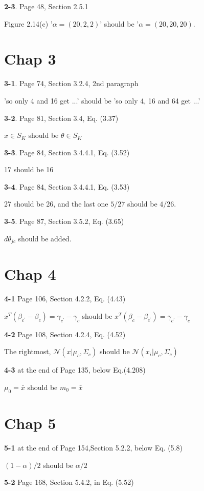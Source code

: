 \documentclass[aps,preprint,a4]{revtex4-1}
\begin{document}
{\color{red}\textbf{2-3}}. Page 48, Section 2.5.1

Figure 2.14(c) '$\alpha = (20,2,2)$' should be '$\alpha = (20,20,20)$.
\section{Chap 3}
{\color{red}\textbf{3-1}}. Page 74, Section 3.2.4, 2nd paragraph

'so only 4 and 16 get ...' should be 'so only 4, 16 and 64 get ...'

{\color{red}\textbf{3-2}}.  Page 81, Section 3.4, Eq. (3.37)

$x\in S_{K}$ should be $\theta \in S_{K}$ 

{\color{red}\textbf{3-3}}.  Page 84, Section 3.4.4.1, Eq. (3.52)

17 should be 16

{\color{red}\textbf{3-4}}.  Page 84, Section 3.4.4.1, Eq. (3.53)

27 should be 26, and the last one $5/27$ should be $4/26$.

{\color{red}\textbf{3-5}}.  Page 87, Section 3.5.2, Eq. (3.65)

$d\theta_{jc}$ should be added.

\section{Chap 4}
{\color{red}\textbf{4-1}} Page 106, Section 4.2.2, Eq. (4.43)

$x^{T}(\beta_{c^{\prime}}-\beta_{c})=\gamma_{c^{\prime}}-\gamma_{c}$
should be
 $x^{T}(\beta_{c}-\beta_{c^{\prime}})=\gamma_{c^{\prime}}-\gamma_{c}$

{\color{red}\textbf{4-2}} Page 108, Section 4.2.4, Eq. (4.52)

The rightmost, $\mathcal N(x|\mu_{c},\Sigma_{c})$ should be
$\mathcal N(x_{i}|\mu_{c},\Sigma_{c})$

{\color{red}\textbf{4-3}} at the end of Page 135, below Eq.(4.208)

$\mu_{0}=\bar{x}$ should be $m_{0}=\bar{x}$

\section{Chap 5}
{\color{red}\textbf{5-1}} at the end of Page 154,Section 5.2.2, below Eq. (5.8)

$(1-\alpha)/2$ should be $\alpha/2$

{\color{red}\textbf{5-2}} Page 168, Section 5.4.2, in Eq. (5.52)
\end{document}

